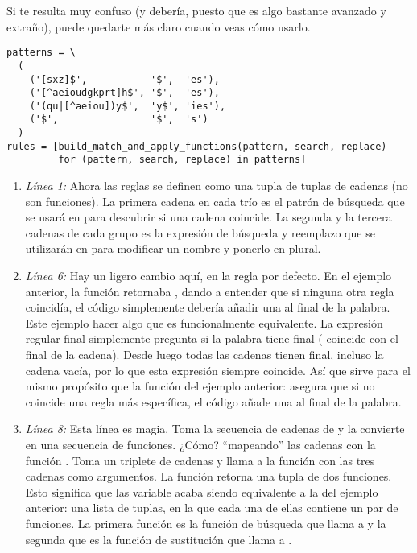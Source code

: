Si te resulta muy confuso (y debería, puesto que es algo bastante avanzado y extraño), puede quedarte más claro cuando veas cómo usarlo.

\noindent\begin{minipage}{\textwidth}
\begin{lstlisting}[mathescape=False]
patterns = \
  (
    ('[sxz]$',           '$',  'es'),
    ('[^aeioudgkprt]h$', '$',  'es'),
    ('(qu|[^aeiou])y$',  'y$', 'ies'),
    ('$',                '$',  's')
  )
rules = [build_match_and_apply_functions(pattern, search, replace)
         for (pattern, search, replace) in patterns]
\end{lstlisting}
\end{minipage}

\begin{enumerate}

\item \emph{Línea 1:} Ahora las reglas se definen como una tupla de tuplas de cadenas (no son funciones). La primera cadena en cada trío es el patrón de búsqueda que se usará en  para descubrir si una cadena coincide. La segunda y la tercera cadenas de cada grupo es la expresión de búsqueda y reemplazo que se utilizarán en  para modificar un nombre y ponerlo en plural.

\item \emph{Línea 6:} Hay un ligero cambio aquí, en la regla por defecto. En el ejemplo anterior, la función  retornaba , dando a entender que si ninguna otra regla coincidía, el código simplemente debería añadir una  al final de la palabra. Este ejemplo hacer algo que es funcionalmente equivalente. La expresión regular final simplemente pregunta si la palabra tiene final (\codigo{\$} coincide con el final de la cadena). Desde luego todas las cadenas tienen final, incluso la cadena vacía, por lo que esta expresión siempre coincide. Así que sirve para el mismo propósito que la función  del ejemplo anterior: asegura que si no coincide una regla más específica, el código añade una  al final de la palabra.

\item \emph{Línea 8:} Esta línea es magia. Toma la secuencia de cadenas de  y la convierte en una secuencia de funciones. ¿Cómo? ``mapeando'' las cadenas con la función . Toma un triplete de cadenas y llama a la función con las tres cadenas como argumentos. La función retorna una tupla de dos funciones. Esto significa que las variable  acaba siendo equivalente a la del ejemplo anterior: una lista de tuplas, en la que cada una de ellas contiene un par de funciones. La primera función es la función de búsqueda que llama a  y la segunda que es la función de sustitución que llama a .

\end{enumerate}

